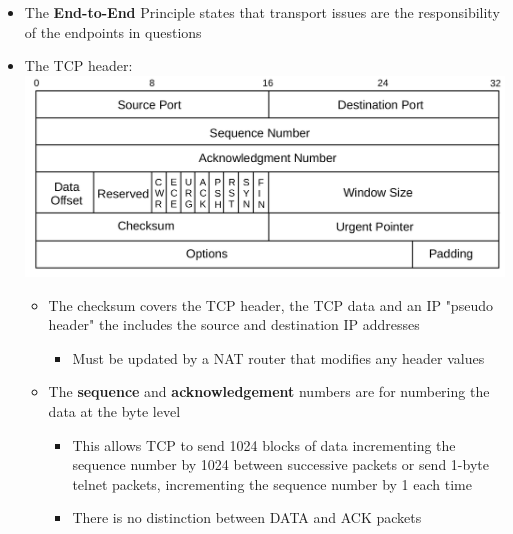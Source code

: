 \documentclass[11pt]{article}
\makeatletter
\def\maxwidth{\ifdim\Gin@nat@width>\linewidth\linewidth
    \else\Gin@nat@width\fi}
\let\Oldincludegraphics\includegraphics
\renewcommand{\includegraphics}[1]{\Oldincludegraphics[width=.8\maxwidth]{#1}}
\providecommand{\tightlist}{%
      \setlength{\itemsep}{0pt}\setlength{\parskip}{0pt}}
\makeatother
\begin{document}
\begin{itemize}
\tightlist
\item
  The \textbf{End-to-End} Principle states that transport issues are the
  responsibility of the endpoints in questions
\item
  The TCP header: \includegraphics{img/tcp_header.png}

  \begin{itemize}
  \tightlist
  \item
    The checksum covers the TCP header, the TCP data and an IP "pseudo
    header" the includes the source and destination IP addresses

    \begin{itemize}
    \tightlist
    \item
      Must be updated by a NAT router that modifies any header values
    \end{itemize}
  \item
    The \textbf{sequence} and \textbf{acknowledgement} numbers are for
    numbering the data at the byte level

    \begin{itemize}
    \tightlist
    \item
      This allows TCP to send 1024 blocks of data incrementing the
      sequence number by 1024 between successive packets or send 1-byte
      telnet packets, incrementing the sequence number by 1 each time
    \item
      There is no distinction between DATA and ACK packets


\end{itemize}
\end{itemize}
\end{itemize}
\end{document}
